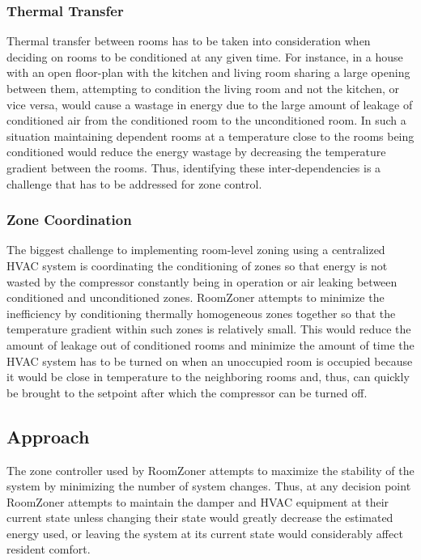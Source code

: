 
\subsubsection{Thermal Transfer}
\label{sec:thermalTransfer}
Thermal transfer between rooms has to be taken into consideration when deciding
on rooms to be conditioned at any given time. For instance, in a house with an
open floor-plan with the kitchen and living room sharing a large opening between
them, attempting to condition the living room and not the kitchen, or vice
versa, would cause a wastage in energy due to the large amount of leakage of
conditioned air from the conditioned room to the unconditioned room. In such a
situation maintaining dependent rooms at a temperature close to the rooms being
conditioned would reduce the energy wastage by decreasing the temperature
gradient between the rooms. Thus, identifying these inter-dependencies is a
challenge that has to be addressed for zone control.

\subsubsection{Zone Coordination}
The biggest challenge to implementing room-level zoning using a centralized HVAC
system is coordinating the conditioning of zones so that energy is not wasted by
the compressor constantly being in operation or air leaking between conditioned
and unconditioned zones. RoomZoner attempts to minimize the inefficiency
by conditioning thermally homogeneous zones together so that the temperature
gradient within such zones is relatively small. This would reduce the amount of
leakage out of conditioned rooms and minimize the amount of time the HVAC system
has to be turned on when an unoccupied room is occupied because it would be
close in temperature to the neighboring rooms and, thus, can quickly be brought
to the setpoint after which the compressor can be turned off.

\subsection{Approach}

The zone controller used by RoomZoner attempts to maximize the
stability of the system by minimizing the number of system changes. Thus, at any
decision point RoomZoner attempts to maintain the damper and HVAC
equipment at their current state unless changing their state would greatly
decrease the estimated energy used, or leaving the system at its current state
would considerably affect resident comfort.

